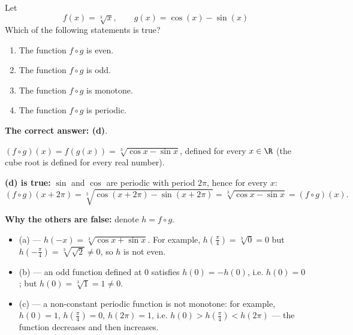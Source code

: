 
\begin{question}
Let
\[
f(x)=\sqrt[3]{x},\qquad g(x)=\cos(x)-\sin(x)
\]
Which of the following statements is true?
\begin{enumerate}
  \item The function $f\circ g$ is even.
  \item The function $f\circ g$ is odd.
  \item The function $f\circ g$ is monotone.
  \item The function $f\circ g$ is periodic.
\end{enumerate}
\end{question}

\begin{solution}
\textbf{The correct answer: (d)}.

$(f\circ g)(x)=f(g(x))=\sqrt[3]{\cos x-\sin x}$, defined for every $x\in\R$ (the cube root is defined for every real number).

\textbf{(d) is true:} $\sin$ and $\cos$ are periodic with period $2\pi$, hence for every $x$:
\[
(f\circ g)(x+2\pi)=\sqrt[3]{\cos(x+2\pi)-\sin(x+2\pi)}=\sqrt[3]{\cos x-\sin x}=(f\circ g)(x).
\]

\textbf{Why the others are false:} denote $h=f\circ g$.
\begin{itemize}
  \item (a) --- $h(-x)=\sqrt[3]{\cos x+\sin x}$. For example, $h\!\left(\frac\pi4\right)=\sqrt[3]{0}=0$ but $h\!\left(-\frac\pi4\right)=\sqrt[3]{\sqrt2}\neq0$, so $h$ is not even.
  \item (b) --- an odd function defined at 0 satisfies $h(0)=-h(0)$, i.e. $h(0)=0$; but $h(0)=\sqrt[3]{1}=1\neq0$.
  \item (c) --- a non-constant periodic function is not monotone: for example, $h(0)=1$, $h\!\left(\frac\pi4\right)=0$, $h(2\pi)=1$, i.e. $h(0)>h(\frac\pi4)<h(2\pi)$ --- the function decreases and then increases.
\end{itemize}
\end{solution}
